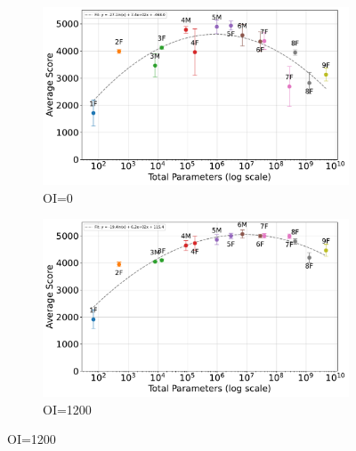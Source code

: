 \begin{figure}[t]
    \centering
    \begin{subfigure}[b]{\linewidth}
        \centering
        \includegraphics[width=\linewidth]{pdf/parameter_performance_plots/params_performance_OI0_EXP6.pdf}
        \caption{OI=0}
        \label{fig:score_vs_tuple_OI0_EXP6}
    \end{subfigure}

    \vspace{1em}
    \begin{subfigure}[b]{\linewidth}
        \centering
        \includegraphics[width=\linewidth]{pdf/parameter_performance_plots/params_performance_OI1200_EXP6.pdf}
        \caption{OI=1200}
        \label{fig:score_vs_tuple_OI1200_EXP6}
    \end{subfigure}


\end{figure}
